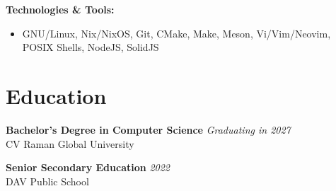 \documentclass[a4paper,11pt]{article}
\begin{document}
\noindent\textbf{Technologies \& Tools:}
\begin{itemize}[noitemsep, topsep=0pt]
    \item GNU/Linux, Nix/NixOS, Git, CMake, Make, Meson, Vi/Vim/Neovim, POSIX Shells, NodeJS, SolidJS
\end{itemize}

\section*{Education}
\noindent\textbf{Bachelor's Degree in Computer Science} \hfill \textit{Graduating in 2027}\\
\noindent CV Raman Global University \vspace{0.5em}

\noindent\textbf{Senior Secondary Education} \hfill \textit{2022}\\
\noindent DAV Public School
\end{document}

